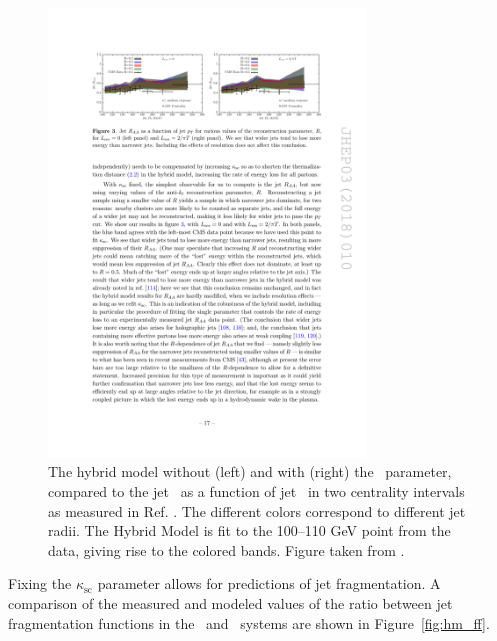 \begin{figure}[htbp]
\begin{center}
\includegraphics[width=0.75\textwidth]{figures/jetMeasurements/HM_raa}
\caption{The hybrid model without (left) and with (right) the \Lres\ parameter, compared to the jet \RAA\ as a function of jet \pt\ in two centrality intervals as measured in Ref. \cite{Khachatryan:2016jfl}. The different colors correspond to different jet radii. The Hybrid Model is fit to the 100--110 GeV point from the data, giving rise to the colored bands. Figure taken from \cite{Hulcher:2017cpt}. }
\label{fig:hm_fitting}
\end{center}
\end{figure}

Fixing the $\kappa_\mathrm{sc}$ parameter allows for predictions of jet fragmentation. A comparison of the measured and modeled values of the ratio between jet fragmentation functions in the \pp\ and \pbpb\ systems are shown in Figure~\ref{fig:hm_ff}. 

